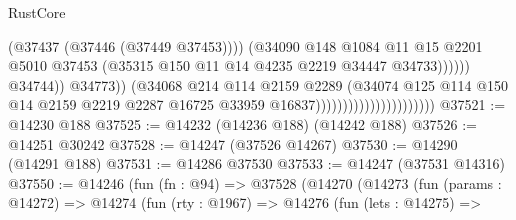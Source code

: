 \begin{lexlean}{RustCore}
\begin{coremodule}
                                                              (@37437 (@37446 (@37449 @37453))))
                                                            (@34090
                                                              @148
                                                              @1084
                                                              @11
                                                              @15
                                                              @2201
                                                              @5010
                                                              @37453
                                                              (@35315
                                                                @150
                                                                @11
                                                                @14
                                                                @4235
                                                                @2219
                                                                @34447
                                                                @34733))))))
                                                    @34744))
                                                @34773))
                                            (@34068
                                              @214
                                              @114
                                              @2159
                                              @2289
                                              (@34074
                                                @125
                                                @114
                                                @150
                                                @14
                                                @2159
                                                @2219
                                                @2287
                                                @16725
                                                @33959
                                                @16837))))))))))))))))))))))
@37521 := @14230 @188
@37525 := @14232 (@14236 @188) (@14242 @188)
@37526 := @14251 @30242
@37528 := @14247 (@37526 @14267)
@37530 := @14290 (@14291 @188)
@37531 := @14286 @37530
@37533 := @14247 (@37531 @14316)
@37550 := @14246
    (fun (fn : @94) =>
    @37528
      (@14270
        (@14273
          (fun (params : @14272) =>
          @14274
            (fun (rty : @1967) =>
            @14276
              (fun (lets : @14275) =>

\end{coremodule}
\end{lexlean}
